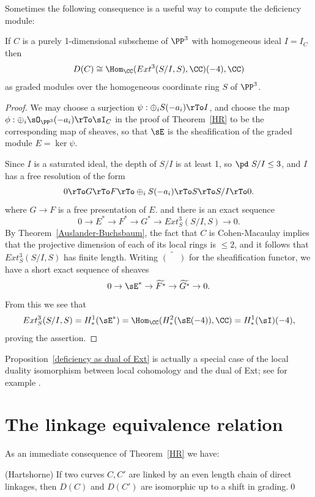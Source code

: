 Sometimes the following consequence is a useful way to compute the deficiency module:

\begin{proposition}\label{deficiency as dual of Ext}
If $C$ is a purely 1-dimensional subscheme of $\PP^3$ with homogeneous ideal $I = I_C$ then 
$$
D(C) \cong \Hom_\CC (Ext^3(S/I, S), \CC)(-4), \CC)
$$
as graded modules over the homogeneous coordinate ring $S$ of $\PP^3$.
\end{proposition}

\begin{proof}
We may choose a surjection  $\psi:  \oplus_iS(-a_i)\rTo I$, and choose the map
$\phi: \oplus_i\sO_{\PP^3}(-a_i)\rTo\sI_C$
in the proof of Theorem~\ref{HR}
to be the corresponding map of sheaves, so that
$\sE$ is the sheafification of the graded module $E = \ker \psi$.

Since $I$ is a saturated ideal,
 the depth of $S/I$ is at least 1, so $\pd\ S/I\leq 3$, and $I$ has a free resolution of the form
$$
0\rTo G \rTo F \rTo \oplus_iS(-a_i)  \rTo S\rTo S/I \rTo 0.
$$
where $G\to F$ is a free presentation of $E$. and there is an exact sequence
$$
0 \to E^* \to F^* \to G^* \to Ext^3_S(S/I, S) \to 0.
$$
By Theorem~\ref{Auslander-Buchsbaum}, the fact that $C$ is Cohen-Macaulay implies that the projective dimension of each of its
local rings is $\leq 2$,  and it follows that
$Ext^3_S(S/I, S)$ has finite length. Writing $\widetilde{(\phantom{-})}$ for the sheafification functor,
we have a short exact sequence of sheaves 
$$
0\to \sE^* \to \widetilde{F^*} \to \widetilde{G^*}\to 0.
$$
From this we see that 
$$
Ext^3_S(S/I,S) = H^1_*(\sE^*) = \Hom_\CC( H^2_*(\sE(-4)),\CC) = H^1_*(\sI)(-4),
$$
proving the assertion.
\end{proof}

Proposition~\ref{deficiency as dual of Ext} is actually a special case of the local duality isomorphism between local cohomology and the dual of Ext; see for example \cite[Theorem A.1.9]{MR2103875}.

\section{The linkage equivalence relation}
As an immediate consequence of Theorem~\ref{HR} we have:
\begin{corollary}(Hartshorne)
 If two curves $C,C'$ are linked by an even length chain of direct linkages, then 
 $D(C)$ and $D(C')$ are isomorphic up to a shift in grading.\qed
\end{corollary}

